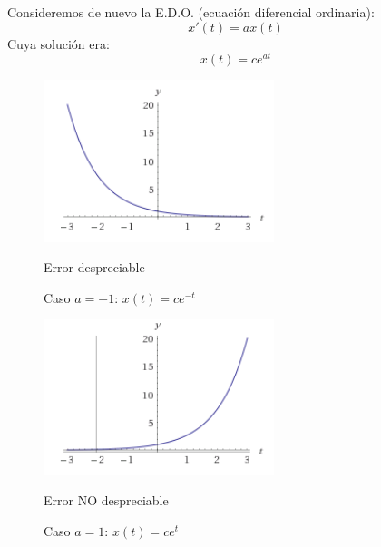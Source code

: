 \documentclass[8pt]{beamer}
\begin{document}
\begin{frame}
\begin{example}
Consideremos de nuevo la E.D.O. (ecuación diferencial ordinaria):
\begin{equation}
x'(t) =ax(t)
\end{equation}
Cuya solución era:
\begin{equation}
x(t) =ce^{at}
\end{equation}
\begin{minipage}{0.48\textwidth}
\begin{center}
\begin{figure}[hbtp]
\centering
\includegraphics[width = 0.6\textwidth]{img/exp.png}
\caption{Caso $a=-1$: $x(t)=ce^{-t}$}
Error despreciable
\end{figure}
\end{center}
\end{minipage}
\begin{minipage}{0.48\textwidth}
\begin{center}
\begin{figure}[hbtp]
\centering
\includegraphics[width = 0.6\textwidth]{img/exp2.png}
\caption{Caso $a=1$: $x(t)=ce^{t}$}
Error NO despreciable
\end{figure}
\end{center}
\end{minipage}
\end{example}
\end{frame}
\end{document}
